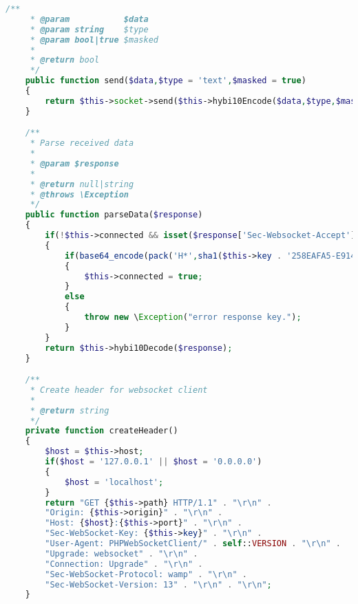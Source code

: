 \begin{lstlisting}[language=PHP]
    /**
     * @param           $data
     * @param string    $type
     * @param bool|true $masked
     *
     * @return bool
     */
    public function send($data,$type = 'text',$masked = true)
    {
        return $this->socket->send($this->hybi10Encode($data,$type,$masked));
    }

    /**
     * Parse received data
     *
     * @param $response
     *
     * @return null|string
     * @throws \Exception
     */
    public function parseData($response)
    {
        if(!$this->connected && isset($response['Sec-Websocket-Accept']))
        {
            if(base64_encode(pack('H*',sha1($this->key . '258EAFA5-E914-47DA-95CA-C5AB0DC85B11'))) === $response['Sec-Websocket-Accept'])
            {
                $this->connected = true;
            }
            else
            {
                throw new \Exception("error response key.");
            }
        }
        return $this->hybi10Decode($response);
    }

    /**
     * Create header for websocket client
     *
     * @return string
     */
    private function createHeader()
    {
        $host = $this->host;
        if($host = '127.0.0.1' || $host = '0.0.0.0')
        {
            $host = 'localhost';
        }
        return "GET {$this->path} HTTP/1.1" . "\r\n" .
        "Origin: {$this->origin}" . "\r\n" .
        "Host: {$host}:{$this->port}" . "\r\n" .
        "Sec-WebSocket-Key: {$this->key}" . "\r\n" .
        "User-Agent: PHPWebSocketClient/" . self::VERSION . "\r\n" .
        "Upgrade: websocket" . "\r\n" .
        "Connection: Upgrade" . "\r\n" .
        "Sec-WebSocket-Protocol: wamp" . "\r\n" .
        "Sec-WebSocket-Version: 13" . "\r\n" . "\r\n";
    }


\end{lstlisting}
